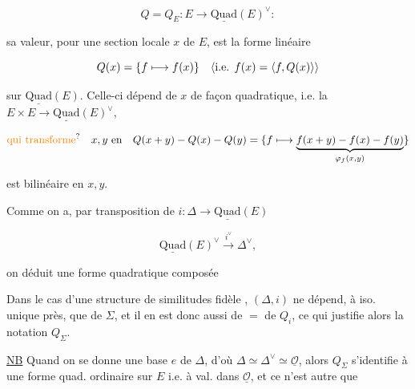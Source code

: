 \[Q=Q_E:E\longrightarrow\underline{\mathrm{Quad}}(E)^\vee:\]

 sa valeur, pour une section locale $x$ de $E$, est la forme linéaire

\[Q(x)=\{f\longmapsto f(x)\}\quad\inserted{\text{i.e. }f(x)=\langle f,Q(x)\rangle}\]

 sur $\underline{\mathrm{Quad}}(E)$. Celle-ci dépend de $x$ de façon quadratique, i.e. la  $E\times E\longrightarrow\underline{\mathrm{Quad}}(E)^\vee$,

\[
\unsure{\text{qui transforme}}\quad x,y\ \text{en}\quad Q(x+y)-Q(x)-Q(y)=\{f\longmapsto\underbrace{f(x+y)-f(x)-f(y)}_{\varphi_f(x,y)}\}
\]

est bilinéaire en $x,y$. 

Comme on a, par transposition de $i:\Delta\longrightarrow\underline{\mathrm{Quad}}(E)$

\[\underline{\mathrm{Quad}}(E)^\vee\xrightarrow{i^\vee}\Delta^\vee,\]

on déduit une forme quadratique composée


Dans le cas d'une structure de similitudes fidèle \inserted{$\Sigma$}, $(\Delta,i)$ ne dépend, à iso.  unique près, que de $\Sigma$, et il en est donc aussi de $=$ de $Q_i$, ce qui justifie alors la notation $Q_\Sigma$. 

\uline{NB} Quand on se donne une base $e$ de $\Delta$, d'où $\Delta\simeq\Delta^\vee\simeq\underline{\mathcal O}$, alors $Q_\Sigma$ s'identifie à une forme quad. ordinaire sur $E$ i.e. à val. dans $\underline{\mathcal O}$, et ce n'est autre que  


